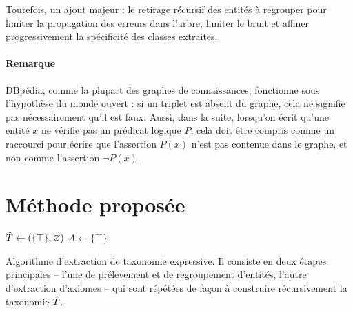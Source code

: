 Toutefois, un ajout majeur : le retirage récursif des entités à regrouper pour limiter la propagation des erreurs dans l'arbre, limiter le bruit et affiner progressivement la spécificité des classes extraites.  %

\paragraph{Remarque}

DBpédia, comme la plupart des graphes de connaissances, fonctionne sous l'hypothèse du monde ouvert : si un triplet est absent du graphe, cela ne signifie pas nécessairement qu'il est faux. Aussi, dans la suite, lorsqu'on écrit qu'une entité $x$ ne vérifie pas un prédicat logique $P$, cela doit être compris comme un raccourci pour écrire que l'assertion $P(x)$ n'est pas contenue dans le graphe, et non comme l'assertion $\neg P(x)$.

\section{Méthode proposée}

\begin{algorithm}

$\hat{T} \leftarrow  (\{ \top \}, \varnothing)$ \;
$A \leftarrow \{ \top \}$\;

\caption{Algorithme d'extraction de taxonomie expressive. Il consiste en deux étapes principales – l'une de prélevement et de regroupement d'entités, l'autre d'extraction d'axiomes – qui sont répétées de façon à construire récursivement la taxonomie $\hat{T}$.}
\label{algo:texp-main}
\end{algorithm}

